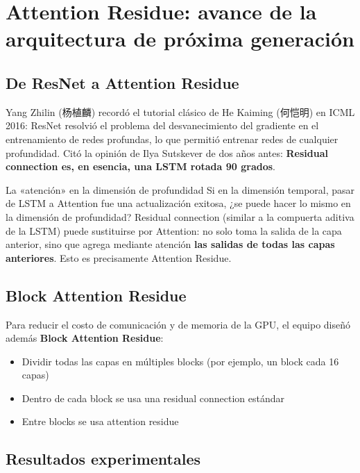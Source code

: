 \section{Attention Residue: avance de la arquitectura de próxima generación}

\subsection{De ResNet a Attention Residue}

Yang Zhilin (杨植麟) recordó el tutorial clásico de He Kaiming (何恺明) en ICML 2016: ResNet resolvió el problema del desvanecimiento del gradiente en el entrenamiento de redes profundas, lo que permitió entrenar redes de cualquier profundidad. Citó la opinión de Ilya Sutskever de dos años antes: \textbf{Residual connection es, en esencia, una LSTM rotada 90 grados}.

\begin{knowledgebox}{La «atención» en la dimensión de profundidad}
Si en la dimensión temporal, pasar de LSTM a Attention fue una actualización exitosa, ¿se puede hacer lo mismo en la dimensión de profundidad? Residual connection (similar a la compuerta aditiva de la LSTM) puede sustituirse por Attention: no solo toma la salida de la capa anterior, sino que agrega mediante atención \textbf{las salidas de todas las capas anteriores}. Esto es precisamente Attention Residue.
\end{knowledgebox}

\subsection{Block Attention Residue}

Para reducir el costo de comunicación y de memoria de la GPU, el equipo diseñó además \textbf{Block Attention Residue}:
\begin{itemize}
    \item Dividir todas las capas en múltiples blocks (por ejemplo, un block cada 16 capas)
    \item Dentro de cada block se usa una residual connection estándar
    \item Entre blocks se usa attention residue
\end{itemize}

\subsection{Resultados experimentales}


